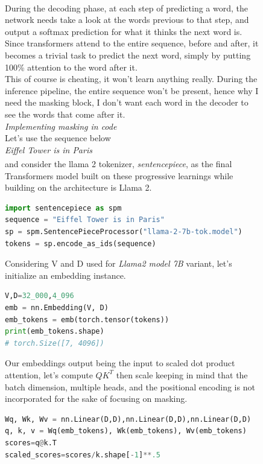 \documentclass[12pt]{article}
\newcommand{\customtext}[3]{%
    \vspace{#2} %
    \fontsize{13}{8}\textcolor{#1}{\textit{#3}}%
}
\newcommand{\sidecite}[1]{\textsuperscript{\textcolor{blue}{\textbf{\scriptsize#1}}}}
\newcommand{\maincitecount}{\sidecite{\stepcounter{maincite}\themaincite}}
\begin{document}
\begin{figure}[!htb]
    \begin{minipage}[t]{0.65\textwidth}
    During the decoding phase, at each step of predicting a word{\maincitecount}, the network needs take a look 
    at the words previous to that step, and output a softmax prediction for what it thinks the next word 
    is. Since transformers attend to the entire sequence, before and after, it becomes a trivial task to predict 
    the next word, simply by putting 100\% attention to the word after it.\\
    This of course is cheating, it won't learn anything really. During the inference pipeline, the entire sequence 
    won't be present, hence why I need the masking block, I don't want each word in the decoder to see the words 
    that come after it.\\
    \customtext{xtitle}{1em}{Implementing masking in code}\\
    Let's use the sequence below\\
    {\it Eiffel Tower is in Paris}\\
    and consider the llama 2 tokenizer{\maincitecount}, {\it sentencepiece}, as the final Transformers model built on these progressive learnings  
    while building on the architecture is Llama 2.
\begin{lstlisting}[language=python,style=python,basicstyle=\ttfamily\footnotesize]
import sentencepiece as spm 
sequence = "Eiffel Tower is in Paris"
sp = spm.SentencePieceProcessor("llama-2-7b-tok.model")
tokens = sp.encode_as_ids(sequence)
\end{lstlisting}
Considering V and D used for {\it Llama2 model 7B} variant, let's initialize an embedding instance. 
\begin{lstlisting}[language=python,style=python,basicstyle=\ttfamily\footnotesize]
V,D=32_000,4_096
emb = nn.Embedding(V, D)
emb_tokens = emb(torch.tensor(tokens))
print(emb_tokens.shape)
# torch.Size([7, 4096])
\end{lstlisting}
Our embeddings output being the input to scaled dot product attention, let's compute $QK^T$ then scale
keeping in mind that the batch dimension, multiple heads, and the positional encoding is not incorporated 
for the sake of focusing on masking.
\begin{lstlisting}[language=python,style=python,basicstyle=\ttfamily\footnotesize]
Wq, Wk, Wv = nn.Linear(D,D),nn.Linear(D,D),nn.Linear(D,D)
q, k, v = Wq(emb_tokens), Wk(emb_tokens), Wv(emb_tokens)
scores=q@k.T
scaled_scores=scores/k.shape[-1]**.5

\end{lstlisting}
\end{minipage}
\end{figure}
\end{document}

